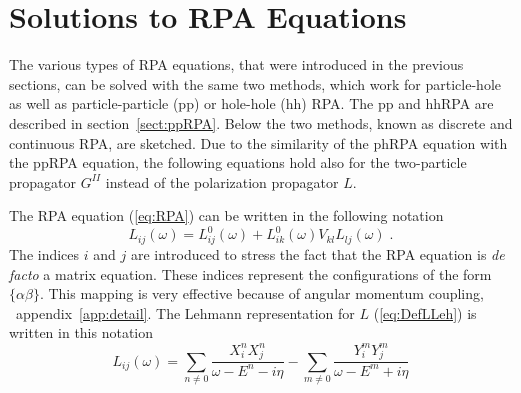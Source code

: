 \section{Solutions to RPA Equations\label{sec:RPAsol}}
The various types of RPA equations, that were introduced in the previous
sections, can be solved with
the same two methods, which work for particle-hole
as well as particle-particle (pp) or hole-hole (hh) RPA. 
The pp and hhRPA are described 
in section~\ref{sect:ppRPA}. Below the two methods, known as
discrete and continuous RPA, are sketched. Due to the similarity of 
the phRPA equation with the ppRPA equation, 
the following equations hold also for 
the two-particle propagator $G^{II}$ instead of 
the polarization propagator $L$.

The RPA equation (\ref{eq:RPA}) can be written in the following notation
%
	\begin{equation}
		L_{ij}(\omega)
	=
		L^0_{ij}(\omega)
	+	
		L^0_{ik}(\omega)
		V_{kl}
		L_{lj}(\omega)
	\label{eq:phRPA}
	\;.
	\end{equation}
%
The indices $i$ and $j$ are introduced to stress the fact that the RPA 
equation is {\em de facto} a matrix equation. 
These indices  represent the configurations of the form $\{\alpha\beta\}$.
This mapping is very effective because of angular momentum coupling, \cf\
appendix~\ref{app:detail}.
The Lehmann representation for $L$ (\ref{eq:DefLLeh}) is written in this 
notation
%
	\begin{equation}
		L_{ij}(\omega)
	=
		\sum_{n \neq 0}
		\frac{ X^n_i X^n_j }
		{ \omega - E^n - i \eta }
	-
		\sum_{m \neq 0}
		\frac{ Y^m_i Y^m_j }
		{ \omega - E^m + i \eta }
	\label{eq:solL}
	\end{equation}
%

